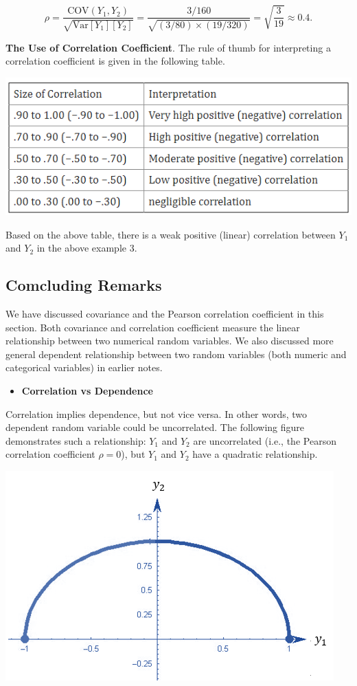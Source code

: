 \documentclass[
]{book}
\providecommand{\tightlist}{%
  \setlength{\itemsep}{0pt}\setlength{\parskip}{0pt}}
\begin{document}
\[
\rho = \frac{\text{COV}(Y_1, Y_2)}{\sqrt{\text{Var}[Y_1]\text{}[Y_2]}} = \frac{3/160}{\sqrt{(3/80)\times (19/320)}} = \sqrt{\frac{3}{19}} \approx 0.4.
\]

\textbf{The Use of Correlation Coefficient}. The rule of thumb for interpreting a correlation coefficient is given in the following table.

\begin{center}\includegraphics[width=0.6\linewidth]{topic08/pearsonCorrelationCoef} \end{center}

Based on the above table, there is a weak positive (linear) correlation between \(Y_1\) and \(Y_2\) in the above example 3.

\hfill\break

\hypertarget{comcluding-remarks}{%
\subsection{Comcluding Remarks}\label{comcluding-remarks}}

We have discussed covariance and the Pearson correlation coefficient in this section. Both covariance and correlation coefficient measure the linear relationship between two numerical random variables. We also discussed more general dependent relationship between two random variables (both numeric and categorical variables) in earlier notes.

\begin{itemize}
\tightlist
\item
  \textbf{Correlation vs Dependence}
\end{itemize}

Correlation implies dependence, but not vice versa. In other words, two dependent random variable could be uncorrelated. The following figure demonstrates such a relationship: \(Y_1\) and \(Y_2\) are uncorrelated (i.e., the Pearson correlation coefficient \(\rho = 0\)), but \(Y_1\) and \(Y_2\) have a quadratic relationship.

\begin{center}\includegraphics[width=0.4\linewidth]{topic08/correlationDependence} \end{center}
\end{document}
